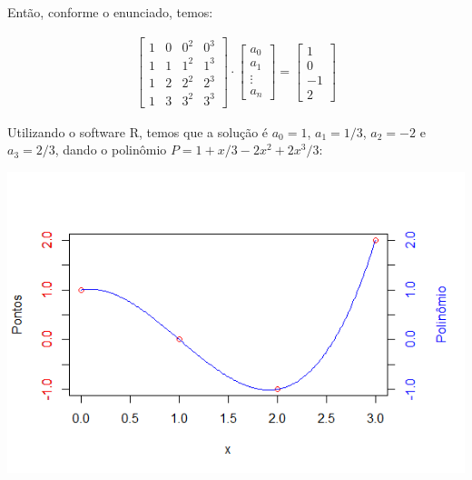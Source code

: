 \documentclass[12pt,a4paper]{article}
\begin{document}
Então, conforme o enunciado, temos:

\begin{align*}
\begin{bmatrix}
1 & 0 & 0^2 & 0^3  \\ 
1 & 1 & 1^2 & 1^3 \\ 
1 & 2 & 2^2 & 2^3 \\ 
1 & 3 & 3^2 & 3^3
\end{bmatrix} 
\cdot
\begin{bmatrix}
a_0\\
a_1\\
\vdots\\
a_n
\end{bmatrix}
=
\begin{bmatrix}
1\\
0\\
-1\\
2
\end{bmatrix}
\end{align*}

Utilizando o software R, temos que a solução é $ a_0 = 1$, $ a_1=1/3 $, $a_2=-2  $ e $ a_3=2/3 $, dando o polinômio $ P = 1 + x/3 -2x^2 + 2x^3/3  $:


\includegraphics[width=1\linewidth]{./ex1}
\end{document}
